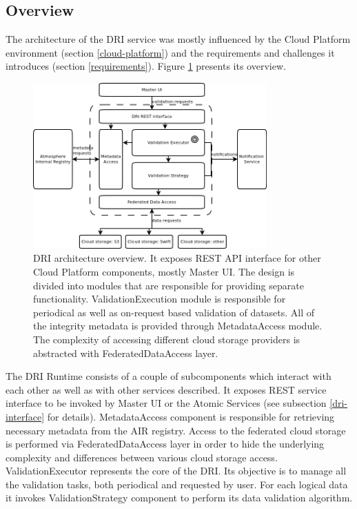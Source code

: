 \subsection{Overview}
The architecture of the DRI service was mostly influenced by the Cloud Platform
environment (section \ref{cloud-platform}) and the requirements and challenges
it introduces (section \ref{requirements}). Figure \ref{fig:dri-architecture}
presents its overview.\\

\begin{figure}[h!]
	\centering
	\includegraphics[width=0.8\textwidth]{images/dri-architecture.png}
	\caption{DRI architecture overview. It exposes REST API interface for other
	Cloud Platform components, mostly Master UI. The design is divided into
	modules that are responsible for providing separate functionality.
	ValidationExecution module is responsible for periodical as well as on-request
	based validation of datasets. All of the integrity metadata is provided
	through MetadataAccess module. The complexity of accessing different cloud
	storage providers is abstracted with FederatedDataAccess layer.}
	\label{fig:dri-architecture}
\end{figure}

The DRI Runtime consists of a couple of subcomponents which interact with each
other as well as with other services described. It exposes REST service
interface to be invoked by Master UI or the Atomic Services (see subsection
\ref{dri-interface} for details). MetadataAccess component is responsible for
retrieving necessary metadata from the AIR registry. Access to the federated
cloud storage is performed via FederatedDataAccess layer in order to hide
the underlying complexity and differences between various cloud storage access.
ValidationExecutor represents the core of the DRI. Its objective is to manage
all the validation tasks, both periodical and requested by user. For
each logical data it invokes ValidationStrategy component to perform
its data validation algorithm.

